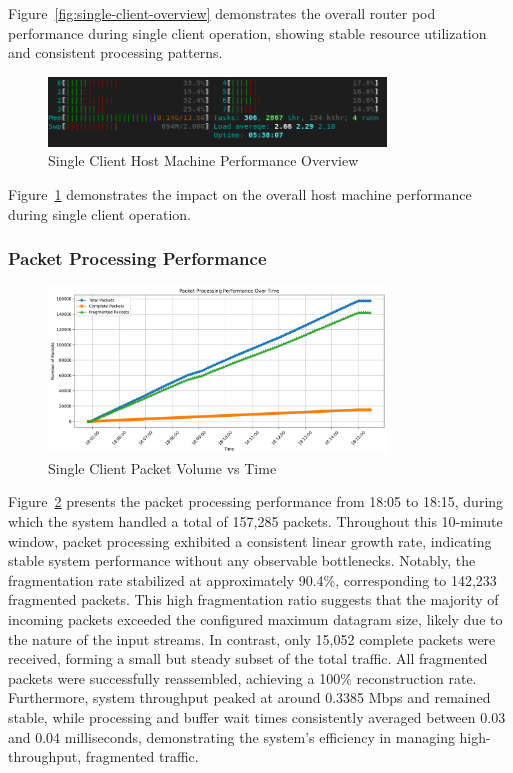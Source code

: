 Figure~\ref{fig:single-client-overview} demonstrates the overall router pod performance during single client operation, showing stable resource utilization and consistent processing patterns.

\begin{figure}[h!]
\centering
\includegraphics[width=0.8\textwidth]{Evaluation/single-client-host-stats.png}
\caption{Single Client Host Machine Performance Overview}
\label{fig:single-client-host-overview}
\end{figure}
Figure~\ref{fig:single-client-host-overview} demonstrates the impact on the overall host machine performance during single client operation.



\subsubsection{Packet Processing Performance}

\begin{figure}[h!]
\centering
\includegraphics[width=0.8\textwidth]{Evaluation/single_packet_processing_performance.png}
\caption{Single Client Packet Volume vs Time}
\label{fig:single-packet-performance}
\end{figure}

Figure~\ref{fig:single-packet-performance} presents the packet processing performance from 18:05 to 18:15, during which the system handled a total of 157,285 packets. Throughout this 10-minute window, packet processing exhibited a consistent linear growth rate, indicating stable system performance without any observable bottlenecks. Notably, the fragmentation rate stabilized at approximately 90.4\%, corresponding to 142,233 fragmented packets. This high fragmentation ratio suggests that the majority of incoming packets exceeded the configured maximum datagram size, likely due to the nature of the input streams. In contrast, only 15,052 complete packets were received, forming a small but steady subset of the total traffic. All fragmented packets were successfully reassembled, achieving a 100\% reconstruction rate. Furthermore, system throughput peaked at around 0.3385 Mbps and remained stable, while processing and buffer wait times consistently averaged between 0.03 and 0.04 milliseconds, demonstrating the system's efficiency in managing high-throughput, fragmented traffic.



